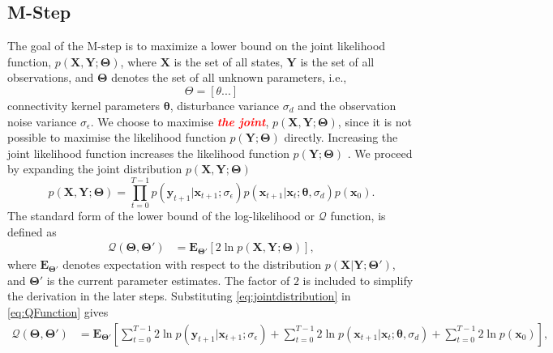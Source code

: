 \documentclass[]{article}
\newcommand{\dean}[1]{\textsf{\emph{\textbf{\textcolor{red}{#1}}}}}
\begin{document}
\subsection{M-Step}
The goal of the M-step is to maximize a lower bound on the joint likelihood function, $p(\mathbf X,\mathbf Y;\boldsymbol \Theta)$, where $\mathbf X$ is the set of all states, $\mathbf Y$ is the set of all observations, and $\boldsymbol \Theta$ denotes the set of all unknown parameters, i.e.,
\begin{equation}
	\Theta = [\theta ...]
\end{equation}
 connectivity kernel parameters $\boldsymbol\theta$, disturbance variance $\sigma_d$ and the observation noise variance $\sigma_{\epsilon}$. We choose to maximise \dean{the joint}, $p(\mathbf X,\mathbf Y;\boldsymbol \Theta)$, since it is not  possible to maximise the likelihood function $p(\mathbf Y;\boldsymbol\Theta)$ directly. Increasing the joint likelihood function increases the likelihood function $p(\mathbf Y;\boldsymbol \Theta)$ \cite{McLachlan1997}. We proceed by expanding the joint distribution $p(\mathbf X,\mathbf Y;\boldsymbol \Theta)$
\begin{equation}\label{eq:jointdistribution}
 p(\mathbf X,\mathbf Y;\boldsymbol \Theta)=\prod_{t=0}^{T-1} p(\mathbf y_{t+1}|\mathbf x_{t+1}; \sigma_{\epsilon})p(\mathbf x_{t+1}|\mathbf x_{t};\boldsymbol \theta, \sigma_d)p(\mathbf x_0).
\end{equation}
The standard form of the lower bound of the log-likelihood or $\mathcal{Q}$ function, is defined as   
\begin{align}\label{eq:QFunction}
 \mathcal Q(\boldsymbol \Theta,\boldsymbol\Theta')&=\mathbf E_{\boldsymbol \Theta'}\left[2\ln p(\mathbf X,\mathbf Y;\boldsymbol \Theta)\right],
\end{align}
where $ \mathbf E_{\boldsymbol \Theta'}$ denotes expectation with respect to the distribution $p(\mathbf X | \mathbf Y;\boldsymbol \Theta')$, and $\boldsymbol \Theta'$ is the current parameter estimates. The factor of $2$ is included to simplify the derivation in the later steps. Substituting  \ref{eq:jointdistribution} in \ref{eq:QFunction} gives
\begin{align}
 \mathcal Q(\boldsymbol \Theta,\boldsymbol\Theta')&=\mathbf E_{\boldsymbol\Theta'}\left[\sum_{t=0}^{T-1}2\ln p(\mathbf y_{t+1}|\mathbf x_{t+1};\sigma_{\epsilon})+\sum_{t=0}^{T-1}2\ln p(\mathbf x_{t+1}|\mathbf x_{t};\boldsymbol \theta, \sigma_d)+\sum_{t=0}^{T-1}2\ln p(\mathbf x_0)\right],
\end{align}
\end{document}

